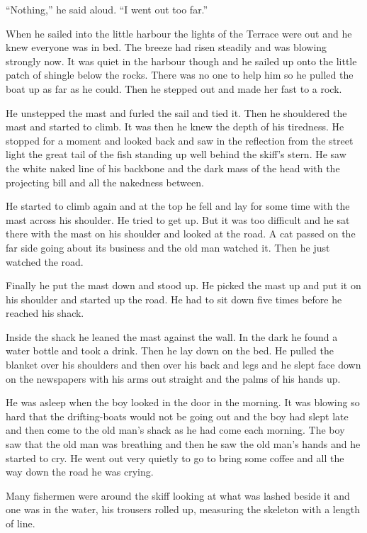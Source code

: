 \documentclass[fontset=ubuntu]{ctexrep}
\begin{document}
``Nothing,'' he said aloud. ``I went out too far.''

When he sailed into the little harbour the lights of the Terrace were out
and he knew everyone was in bed. The breeze had risen steadily and was
blowing strongly now. It was quiet in the harbour though and he sailed up
onto the little patch of \gls{shingle} below the \glspl{rock}. There was no
one to help him so he pulled the boat up as far as he could. Then he stepped
out and made her fast to a rock.

He unstepped the mast and furled the sail and tied it. Then he shouldered
the mast and started to climb. It was then he knew the depth of his
\gls{tiredness}. He stopped for a moment and looked back and saw in the
reflection from the street light the great tail of the fish standing up well
behind the skiff's stern. He saw the white naked line of his backbone and
the dark mass of the head with the projecting bill and all the
\gls{nakedness} between.

He started to climb again and at the top he fell and lay for some time with
the mast across his shoulder. He tried to get up. But it was too difficult
and he sat there with the mast on his shoulder and looked at the road. A
cat passed on the far side going about its business and the old man watched
it. Then he just watched the road.

Finally he put the mast down and stood up. He picked the mast up and put it
on his shoulder and started up the road. He had to sit down five times
before he reached his shack.

Inside the shack he leaned the mast against the wall. In the dark he found a
water bottle and took a drink. Then he lay down on the bed. He pulled the
blanket over his shoulders and then over his back and legs and he slept face
down on the newspapers with his arms out straight and the palms of his hands
up.

He was asleep when the boy looked in the door in the morning. It was
blowing so hard that the drifting-boats would not be going out and the boy
had slept late and then come to the old man's shack as he had come each
morning. The boy saw that the old man was breathing and then he saw the old
man's hands and he started to cry. He went out very quietly to go to bring
some coffee and all the way down the road he was crying.

Many fishermen were around the skiff looking at what was lashed beside it
and one was in the water, his trousers rolled up, \gls{measuring} the skeleton
with a length of line.
\end{document}
